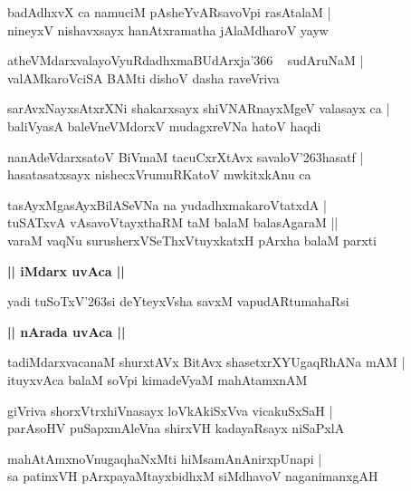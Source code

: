 \documentclass[twoside,12pt,openright]{book}
\def\S{\char'263}
\newcounter{shloka}[chapter]
\def\uvaca#1{\centerline{{\large\textbf{#1}}}}
\begin{document}
\begin{shloka}%
badAdhxvX ca namuciM pAsheYvARsavoVpi rasAtalaM |\\
nineyxV nishavxsayx hanAtxramatha jAlaMdharoV yayw 
\end{shloka}

\begin{shloka}%
atheVMdarxvalayoVyuRdadhxmaBUdArxja\char'366 ~ sudAruNaM |\\
valAMkaroVciSA BAMti dishoV dasha raveVriva
\end{shloka}

\begin{shloka}%
sarAvxNayxsAtxrXNi shakarxsayx shiVNARnayxMgeV valasayx ca |\\
baliVyasA baleVneVMdorxV mudagxreVNa hatoV haqdi
\end{shloka}

\begin{shloka}%
nanAdeVdarxsatoV BiVmaM tacuCxrXtAvx savaloV\S hasatf |\\
hasatasatxsayx nishecxVrumuRKatoV mwkitxkAnu ca
\end{shloka}

\begin{shloka}%
tasAyxMgasAyxBilASeVNa na yudadhxmakaroVtatxdA |\\
tuSATxvA vAsavoVtayxthaRM taM balaM balasAgaraM ||\\
varaM vaqNu surusherxVSeThxVtuyxkatxH pArxha balaM parxti
\end{shloka}

\uvaca{|| iMdarx uvAca ||}

\begin{shloka}%
yadi tuSoTxV\S si deYteyxVsha savxM vapudARtumahaRsi 
\end{shloka}

\uvaca{|| nArada uvAca ||}

\begin{shloka}%
tadiMdarxvacanaM shurxtAVx BitAvx shasetxrXYUgaqRhANa mAM |\\
ituyxvAca balaM soVpi kimadeVyaM mahAtamxnAM 
\end{shloka}

\begin{shloka}%
giVriva shorxVtrxhiVnasayx loVkAkiSxVva vicakuSxSaH |\\
parAsoHV puSapxmAleVna shirxVH kadayaRsayx niSaPxlA 
\end{shloka}

\begin{shloka}%
mahAtAmxnoVnugaqhaNxMti hiMsamAnAnirxpUnapi |\\
sa patinxVH pArxpayaMtayxbidhxM siMdhavoV naganimanxgAH 
\end{shloka}
\end{document}
